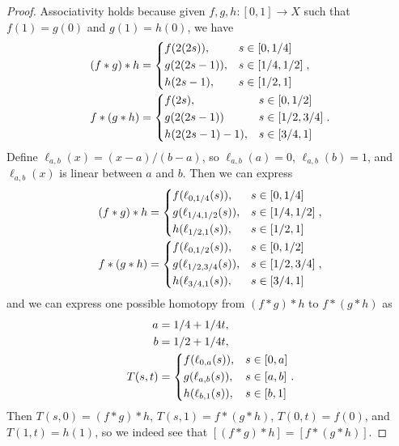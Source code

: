 \begin{proof}
    Associativity holds because given $f, g, h: [0, 1] \to X$ such that $f(1) = g(0)$ and $g(1) = h(0)$, we have
    \begin{align*}
        (f * g) * h &= \begin{dcases}
            f(2(2s)), &s \in [0, 1/4] \\
            g(2(2s-1)), &s \in [1/4, 1/2] \\
            h(2s-1), &s \in [1/2, 1]
        \end{dcases}, \\
        f * (g * h) &= \begin{dcases}
            f(2s), &s \in [0, 1/2] \\
            g(2(2s-1)) &s \in [1/2, 3/4] \\
            h(2(2s-1)-1), &s \in [3/4, 1]
        \end{dcases}.
    \end{align*}
    Define $\ell_{a,b}(x) = (x-a)/(b-a)$, so $\ell_{a,b}(a) = 0$, $\ell_{a,b}(b) = 1$, and $\ell_{a,b}(x)$ is linear between $a$ and $b$. Then we can express
    \begin{align*}
        (f * g) * h &= \begin{dcases}
            f(\ell_{0,1/4}(s)), &s \in [0, 1/4] \\
            g(\ell_{1/4,1/2}(s)), &s \in [1/4, 1/2] \\
            h(\ell_{1/2,1}(s)), &s \in [1/2, 1]
        \end{dcases}, \\
        f * (g * h) &= \begin{dcases}
            f(\ell_{0,1/2}(s)), &s \in [0, 1/2] \\
            g(\ell_{1/2,3/4}(s)), &s \in [1/2, 3/4] \\
            h(\ell_{3/4,1}(s)), &s \in [3/4, 1]
        \end{dcases},
    \end{align*}
    and we can express one possible homotopy from $(f * g) * h$ to $f * (g * h)$ as
    \begin{align*}
        a &= 1/4 + 1/4t, \\
        b &= 1/2 + 1/4t, \\
        T(s, t) &= \begin{dcases}
            f(\ell_{0,a}(s)), &s \in [0, a] \\
            g(\ell_{a,b}(s)), &s \in [a, b] \\
            h(\ell_{b,1}(s)), &s \in [b, 1]
        \end{dcases}.
    \end{align*}
    Then $T(s, 0) = (f * g) * h$, $T(s, 1) = f * (g * h)$, $T(0, t) = f(0)$, and $T(1, t) = h(1)$, so we indeed see that $[(f * g) * h] = [f * (g * h)]$.


\end{proof}
